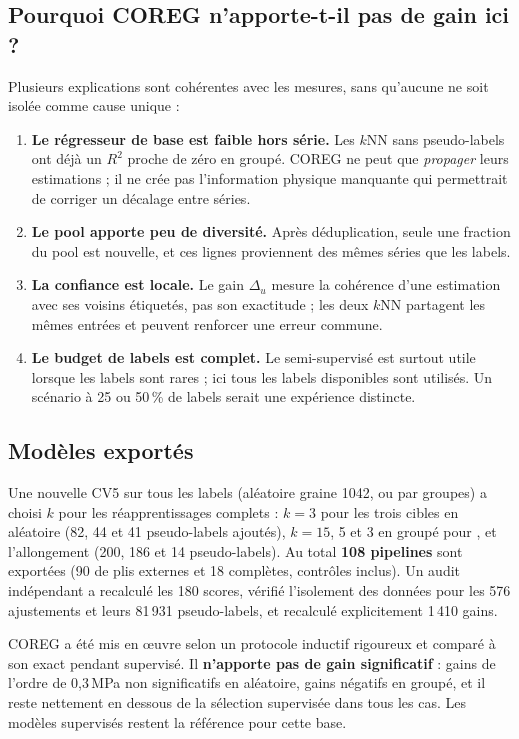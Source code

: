 \subsection{Pourquoi COREG n'apporte-t-il pas de gain ici ?}

Plusieurs explications sont cohérentes avec les mesures, sans qu'aucune ne soit
isolée comme cause unique :
\begin{enumerate}
  \item \textbf{Le régresseur de base est faible hors série.} Les $k$NN sans pseudo-labels ont déjà un $R^2$ proche de zéro en groupé. COREG ne peut que \emph{propager} leurs estimations ; il ne crée pas l'information physique manquante qui permettrait de corriger un décalage entre séries.
  \item \textbf{Le pool apporte peu de diversité.} Après déduplication, seule une fraction du pool est nouvelle, et ces lignes proviennent des mêmes séries que les labels.
  \item \textbf{La confiance est locale.} Le gain $\Delta_u$ mesure la cohérence d'une estimation avec ses voisins étiquetés, pas son exactitude ; les deux $k$NN partagent les mêmes entrées et peuvent renforcer une erreur commune.
  \item \textbf{Le budget de labels est complet.} Le semi-supervisé est surtout utile lorsque les labels sont rares ; ici tous les labels disponibles sont utilisés. Un scénario à 25 ou 50\,\% de labels serait une expérience distincte.
\end{enumerate}

\subsection{Modèles exportés}

Une nouvelle CV5 sur tous les labels (aléatoire graine 1042, ou par groupes) a
choisi $k$ pour les réapprentissages complets : $k = 3$ pour les trois cibles en
aléatoire (82, 44 et 41 pseudo-labels ajoutés), $k = 15$, 5 et 3 en groupé pour
\YS, \UTS{} et l'allongement (200, 186 et 14 pseudo-labels). Au total
\textbf{108 pipelines} sont exportées (90 de plis externes et 18 complètes,
contrôles inclus). Un audit indépendant a recalculé les 180 scores, vérifié
l'isolement des données pour les 576 ajustements et leurs 81\,931 pseudo-labels,
et recalculé explicitement 1\,410 gains.

\begin{aretenir}
COREG a été mis en œuvre selon un protocole inductif rigoureux et comparé à son
exact pendant supervisé. Il \textbf{n'apporte pas de gain significatif} : gains
de l'ordre de 0,3\,MPa non significatifs en aléatoire, gains négatifs en groupé,
et il reste nettement en dessous de la sélection supervisée dans tous les cas.
Les modèles supervisés restent la référence pour cette base.
\end{aretenir}
